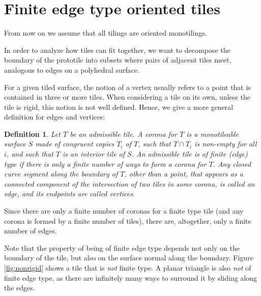 \documentclass[11pt]{amsart}
\newtheorem{definition}[theorem]{Definition}
\theoremstyle{remark}
\begin{document}
 
 
 
 
 
 
 
 
 
 
 
 
\section{Finite edge type oriented tiles}
From now on we assume that all tilings are oriented monotilings.

In order to analyze how tiles can fit together, we want to decompose the boundary of the prototile into subsets where pairs of adjacent tiles meet, analogous to edges on a polyhedral surface.

For a given tiled surface, the notion of a vertex usually refers to a point that is contained in three or more tiles. 
When considering a tile on its own, unless the tile is rigid, this notion is not well defined.
Hence, we give a more general definition for edges and vertices:
\begin{definition}
Let $T$ be an admissible tile. A \emph{corona} for $T$ is a monotileable surface $S$ made of congruent copies $T_i$ of $T$, such that $T\cap T_i$ is non-empty for all $i$, and such that $T$ is an interior tile of $S$.
An admissible tile is of \emph{finite (edge)} type if there is only a finite number of ways to form a corona for $T$.
  Any closed curve segment along the boundary of $T$, other than a point, that appears as 
a connected component of the intersection of two tiles in some corona, is called an \emph{edge}, and its endpoints are called \emph{vertices}.
\end{definition}
Since there are only a finite number of coronas for a finite type tile (and any corona is formed by 
a finite number of tiles), there are, altogether, only a finite number of edges.   

Note that the property of being of finite edge type depends not only on the boundary of the tile, but also on the surface normal along the boundary. Figure \ref{fig:nonrigid} shows a tile that is \emph{not} finite type.  A planar triangle is also \emph{not} of finite edge type, as there are infinitely many ways to surround it by sliding along the edges. 
\end{document}
